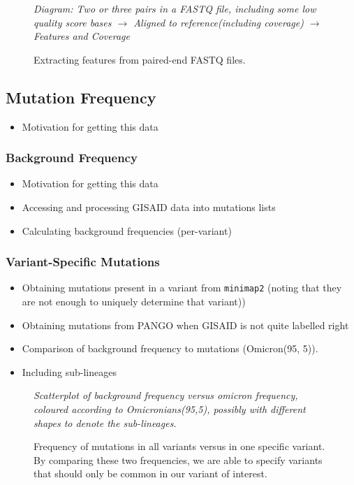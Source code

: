 \documentclass{article}
\newenvironment{tightemize}
{ \begin{itemize}
    \setlength{\itemsep}{0pt}
    \setlength{\parskip}{0pt}
    \setlength{\parsep}{0pt}     }
{ \end{itemize}                  }
\begin{document}
\begin{figure}[ht!]
\vspace{2cm}
\centering
\emph{Diagram: Two or three pairs in a FASTQ file, including some low quality score bases $\rightarrow$ Aligned to reference(including coverage) $\rightarrow$ Features and Coverage}
\vspace{2cm}
\caption{Extracting features from paired-end FASTQ files.}
\label{fig:feature_diagram}
\end{figure}

\subsection{Mutation Frequency}


\begin{tightemize}
    \item Motivation for getting this data
\end{tightemize}

\subsubsection{Background Frequency}
\begin{tightemize}
    \item Motivation for getting this data
    \item Accessing and processing GISAID data into mutations lists
    \item Calculating background frequencies (per-variant)
\end{tightemize}

\subsubsection{Variant-Specific Mutations}

\begin{tightemize}
    \item Obtaining mutations present in a variant from \texttt{minimap2} (noting that they are not enough to uniquely determine that variant))
    \item Obtaining mutations from PANGO when GISAID is not quite labelled right
    \item Comparison of background frequency to mutations (Omicron(95, 5)). 
    \item Including sub-lineages
\end{tightemize}

\begin{figure}[ht!]
\vspace{2cm}
\centering
\emph{Scatterplot of background frequency versus omicron frequency, coloured according to Omicronians(95,5), possibly with different shapes to denote the sub-lineages.}
\vspace{2cm}
\caption{Frequency of mutations in all variants versus in one specific variant. By comparing these two frequencies, we are able to specify variants that should only be common in our variant of interest.}
\label{fig:mutation_frequency}
\end{figure}
\end{document}
